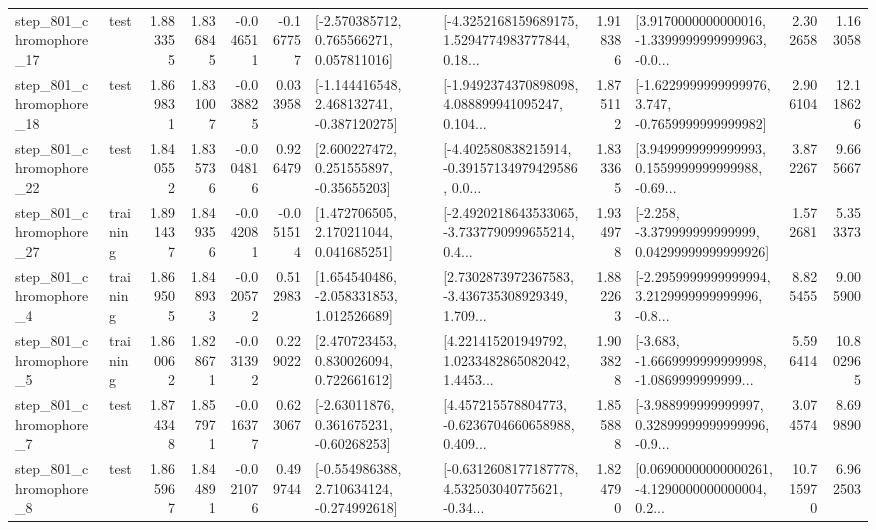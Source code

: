 \begin{tabular}{llrrrrllrlrr}
  step\_801\_chromophore\_17 &      test &      1.883355 &    1.836845 &     -0.046511 & -0.167757 &    [-2.570385712, 0.765566271, 0.057811016] &  [-4.3252168159689175, 1.5294774983777844, 0.18... &       1.918386 &  [3.9170000000000016, -1.3399999999999963, -0.0... &            2.302658 &          1.163058 \\
  step\_801\_chromophore\_18 &      test &      1.869831 &    1.831007 &     -0.038825 &  0.033958 &   [-1.144416548, 2.468132741, -0.387120275] &  [-1.9492374370898098, 4.088899941095247, 0.104... &       1.875112 &  [-1.6229999999999976, 3.747, -0.7659999999999982] &            2.906104 &         12.118626 \\
  step\_801\_chromophore\_22 &      test &      1.840552 &    1.835736 &     -0.004816 &  0.926479 &     [2.600227472, 0.251555897, -0.35655203] &  [-4.402580838215914, -0.39157134979429586, 0.0... &       1.833365 &  [3.9499999999999993, 0.1559999999999988, -0.69... &            3.872267 &          9.665667 \\
  step\_801\_chromophore\_27 &  training &      1.891437 &    1.849356 &     -0.042081 & -0.051514 &     [1.472706505, 2.170211044, 0.041685251] &  [-2.4920218643533065, -3.7337790999655214, 0.4... &       1.934978 &  [-2.258, -3.379999999999999, 0.04299999999999926] &            1.572681 &          5.353373 \\
   step\_801\_chromophore\_4 &  training &      1.869505 &    1.848933 &     -0.020572 &  0.512983 &    [1.654540486, -2.058331853, 1.012526689] &  [2.7302873972367583, -3.436735308929349, 1.709... &       1.882263 &  [-2.2959999999999994, 3.2129999999999996, -0.8... &            8.825455 &          9.005900 \\
   step\_801\_chromophore\_5 &  training &      1.860062 &    1.828671 &     -0.031392 &  0.229022 &     [2.470723453, 0.830026094, 0.722661612] &  [4.221415201949792, 1.0233482865082042, 1.4453... &       1.903828 &  [-3.683, -1.6669999999999998, -1.0869999999999... &            5.596414 &         10.802965 \\
   step\_801\_chromophore\_7 &      test &      1.874348 &    1.857971 &     -0.016377 &  0.623067 &     [-2.63011876, 0.361675231, -0.60268253] &  [4.457215578804773, -0.6236704660658988, 0.409... &       1.855888 &  [-3.988999999999997, 0.32899999999999996, -0.9... &            3.074574 &          8.699890 \\
   step\_801\_chromophore\_8 &      test &      1.865967 &    1.844891 &     -0.021076 &  0.499744 &   [-0.554986388, 2.710634124, -0.274992618] &  [-0.6312608177187778, 4.532503040775621, -0.34... &       1.824790 &  [0.06900000000000261, -4.1290000000000004, 0.2... &           10.715970 &          6.962503 \\

\end{tabular}
